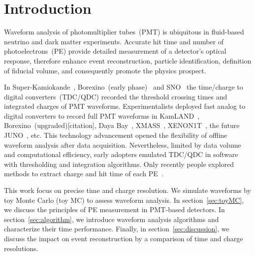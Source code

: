 \section{Introduction}
\label{sec:introduction}

Waveform analysis of photomultiplier tubes~(PMT) is ubiquitous in fluid-based neutrino and dark matter experiments.  Accurate hit time and number of photoelectrons~(PE) provide detailed measurement of a detector's optical response, therefore enhance event reconstruction, particle identification, definition of fiducial volume, and consequently promote the physics prospect.

In Super-Kamiokande~\cite{noauthor_super-kamiokande_2003}, Borexino~(early phase)~\cite{lagomarsino_gateless_1999} and SNO~\cite{dunger_event_2019} the time/charge to digital converters~(TDC/QDC) recorded the threshold crossing times and integrated charges of PMT waveforms.  Experimentalists deployed fast analog to digital converters to record full PMT waveforms in KamLAND~\cite{the_kamland_collaboration_production_2010}, Borexino~(upgraded)[citation], Daya Bay~\cite{huang_flash_2018}, XMASS~\cite{abe_xmass_2013}, XENON1T~\cite{aprile_xenon1t_2019}, the future JUNO~\cite{an_neutrino_2016}, etc.  This technology advancement opened the flexibility of offline waveform analysis after data acquisition.  Nevertheless, limited by data volume and computational efficiency, early adopters emulated TDC/QDC in software with thresholding and integration algorithms.  Only recently people explored methods to extract charge and hit time of each PE~\cite{zhang_comparison_2019}.

This work focus on precise time and charge resolution. We simulate waveforms by toy Monte Carlo (toy MC) to assess waveform analysis.  In section~\ref{sec:toyMC}, we discuss the principles of PE measurement in PMT-based detectors.  In section~\ref{sec:algorithm}, we introduce waveform analysis algorithms and characterize their time performance.  Finally, in section~\ref{sec:discussion}, we discuss the impact on event reconstruction by a comparison of time and charge resolutions.
